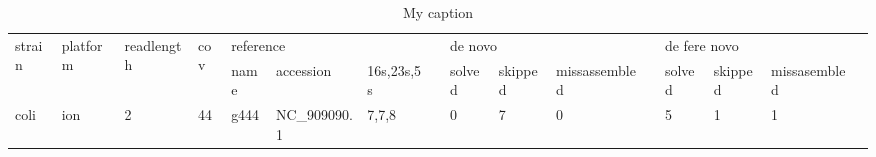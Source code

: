 \documentclass[11pt]{article}
\begin{document}
\begin{table}[]
\centering
\caption{My caption}
\label{my-label}
\begin{tabular}{llllllllllllllll}
  \hline
\multirow{2}{*}{strain} & \multirow{2}{*}{platform} & \multirow{2}{*}{readlength} & \multirow{2}{*}{cov} & \multicolumn{3}{l}{reference} &  & \multicolumn{3}{l}{de novo} &  & \multicolumn{3}{l}{de fere novo} &  \\ \cline{5-7} \cline{9-11} \cline{13-15}
 &  &  &  & name & accession & 16s,23s,5s &  & solved & skipped & missassembled &  & solved & skipped & missasembled &  \\
  \hline
  coli & ion & 2 & 44 & g444 & NC\_909090.1 & 7,7,8 &  & 0 & 7 & 0 &  & 5 & 1 & 1 &
\end{tabular}
\end{table}
\end{document}
